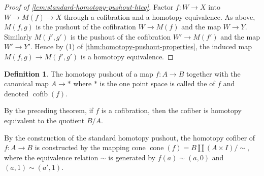 \documentclass{scrartcl}
\let\emph\relax
\theoremstyle{plain}
\theoremstyle{definition}
\newtheorem{definition}[theorem]{Definition}
\DeclareMathOperator{\cone}{cone}
\DeclareMathOperator{\cofib}{cofib}
\renewcommand{\coprod}{\mathbin{\amalg}}
\begin{document}
\begin{proof}[Proof of \cref{lem:standard-homotopy-pushout-hteq}]
    Factor $f\colon W\to X$ into $W\to M(f)\to X$ through a cofibration and a homotopy equivalence. As above, $M(f, g)$ is the pushout of the cofibration $W\to M(f)$ and the map $W\to Y$. Similarly $M(f', g')$ is the pushout of the cofibration $W'\to M(f')$ and the map $W'\to Y'$. Hence by (1) of \cref{thm:homotopy-pushout-properties}, the induced map $M(f, g)\to M(f', g')$ is a homotopy equivalence. 
\end{proof}


\begin{definition}
    The homotopy pushout of a map $f\colon A\to B$ together with the canonical map $A\to *$ where $*$ is the one point space is called the \emph{homotopy cofiber} of $f$ and denoted $\cofib(f)$. 
\end{definition}
By the preceding theorem, if $f$ is a cofibration, then the cofiber is homotopy equivalent to the quotient $B/A$.

By the construction of the standard homotopy pushout, the homotopy cofiber of $f\colon A\to B$ is constructed by the mapping cone $\cone(f) = B\coprod (A\times I) / \sim$, where the equivalence relation $\sim$ is generated by $f(a) \sim (a, 0)$ and $(a, 1)\sim (a', 1)$. 
\end{document}
